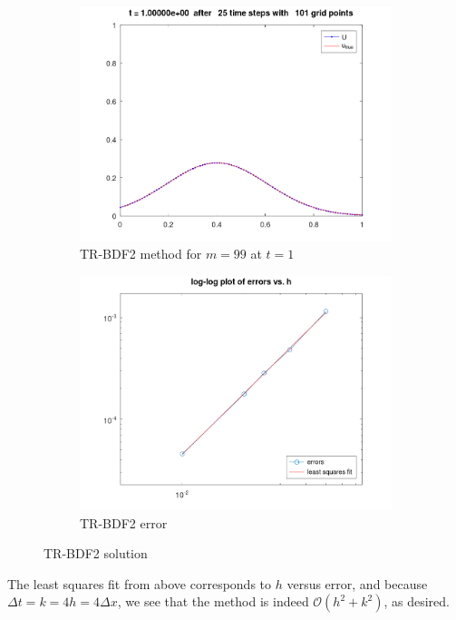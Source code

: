 \begin{solution}
    \begin{figure}[h]
        \centering
        \begin{subfigure}[b]{0.475\textwidth}
            \centering
            \includegraphics[width=\textwidth]{problem_2b_heatTRBDF2_t-25.png}
            \caption{TR-BDF2 method for $m = 99$ at $t = 1$}
        \end{subfigure}
        \hfill
        \begin{subfigure}[b]{0.475\textwidth}
            \centering
            \includegraphics[width=\textwidth]{problem_2b_heatTRBDF2_error.png}
            \caption{TR-BDF2 error}
        \end{subfigure}
        \caption[]{TR-BDF2 solution}
    \end{figure}

    The least squares fit from above corresponds to $h$ versus error, and because \linebreak
    $\Delta t = k = 4h = 4 \Delta x$, we see that the  method is indeed \linebreak
    $\mathcal{O}\left(h^2 + k^2\right)$, as desired.
    \ \\
\end{solution}